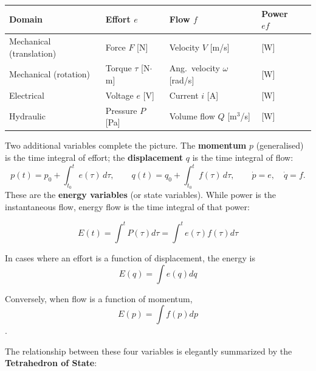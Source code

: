 \begin{center}
\begin{tabular}{lllll}
  \toprule
  \textbf{Domain} & \textbf{Effort} $e$ & \textbf{Flow} $f$ & \textbf{Power} $ef$ \\
  \midrule
  Mechanical (translation) & Force $F$ [N] & Velocity $V$ [m/s] & [W] \\
  Mechanical (rotation)    & Torque $\tau$ [N$\cdot$m] & Ang.\ velocity $\omega$ [rad/s] & [W] \\
  Electrical               & Voltage $e$ [V] & Current $i$ [A] & [W] \\
  Hydraulic                & Pressure $P$ [Pa] & Volume flow $Q$ [m$^3$/s] & [W] \\
  \bottomrule
\end{tabular}
\end{center}

Two additional variables complete the picture.
The \textbf{momentum} $p$ (generalised) is the time integral of effort;
the \textbf{displacement} $q$ is the time integral of flow:
\begin{equation}
  p(t) = p_0 + \int_{t_0}^t e(\tau)\,d\tau,
  \qquad
  q(t) = q_0 + \int_{t_0}^t f(\tau)\,d\tau,
  \qquad
  \dot{p} = e,\quad \dot{q} = f.
\end{equation}
These are the \textbf{energy variables} (or state variables). 
While power is the instantaneous flow, energy flow is the time integral of that power:

$$
E(t) = \int^t P(\tau) d\tau = \int^t e(\tau)f(\tau) d\tau
$$

In cases where an effort is a function of displacement, the energy is $$ E(q) = \int e(q) dq $$

Conversely, when flow is a function of momentum, $$E(p) = \int f(p) dp$$.

The relationship between these four variables is elegantly summarized by the \textbf{Tetrahedron of State}:

\begin{center}
\end{center}


